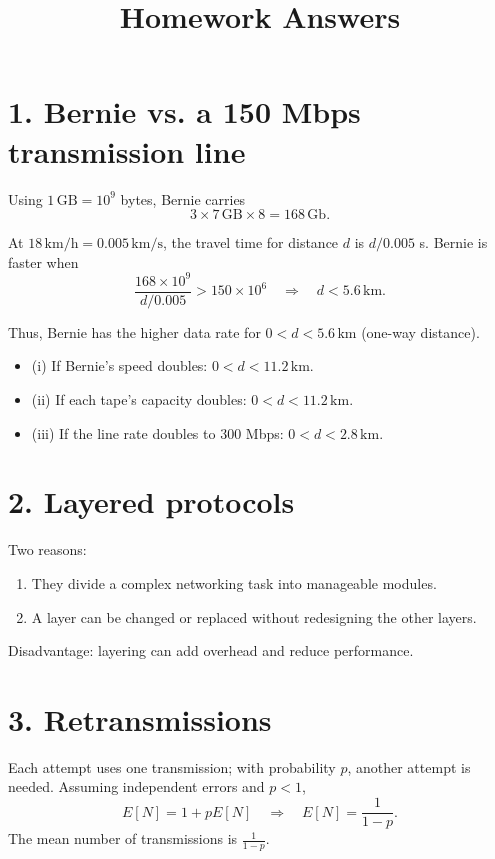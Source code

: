 \documentclass[11pt]{article}
\title{Homework Answers}
\author{}
\date{}
\begin{document}
\maketitle

\section*{1. Bernie vs. a 150 Mbps transmission line}

Using \(1\,\mathrm{GB}=10^9\) bytes, Bernie carries
\[
3 \times 7\,\mathrm{GB} \times 8 = 168\,\mathrm{Gb}.
\]

At \(18\,\mathrm{km/h}=0.005\,\mathrm{km/s}\), the travel time for distance \(d\) is \(d/0.005\) s. Bernie is faster when
\[
\frac{168\times10^9}{d/0.005} > 150\times10^6
\quad\Rightarrow\quad d<5.6\,\mathrm{km}.
\]

Thus, Bernie has the higher data rate for \(0<d<5.6\,\mathrm{km}\) (one-way distance).

\begin{itemize}[leftmargin=*]
  \item (i) If Bernie's speed doubles: \(0<d<11.2\,\mathrm{km}\).
  \item (ii) If each tape's capacity doubles: \(0<d<11.2\,\mathrm{km}\).
  \item (iii) If the line rate doubles to 300 Mbps: \(0<d<2.8\,\mathrm{km}\).
\end{itemize}

\section*{2. Layered protocols}

Two reasons:
\begin{enumerate}[leftmargin=*]
  \item They divide a complex networking task into manageable modules.
  \item A layer can be changed or replaced without redesigning the other layers.
\end{enumerate}

Disadvantage: layering can add overhead and reduce performance.

\section*{3. Retransmissions}

Each attempt uses one transmission; with probability \(p\), another attempt is needed. Assuming independent errors and \(p<1\),
\[
E[N]=1+pE[N]
\quad\Rightarrow\quad
E[N]=\frac{1}{1-p}.
\]
The mean number of transmissions is \(\frac{1}{1-p}\).
\end{document}
